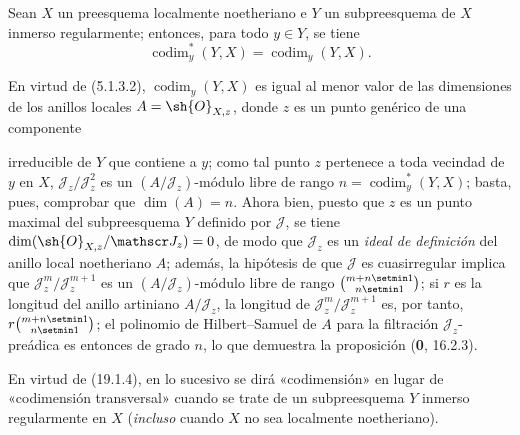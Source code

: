 \begin{proposition}[19.1.4]
\label{IV.19.1.4}
Sean $X$ un preesquema localmente noetheriano e $Y$ un subpreesquema de $X$ inmerso regularmente; entonces, para todo $y\in Y$, se tiene
\begin{equation}
  \operatorname{codim}_y^*(Y,X)=\operatorname{codim}_y(Y,X).
  \tag{19.1.4.1}\label{IV.19.1.4.1}
\end{equation}
\end{proposition}

En virtud de (5.1.3.2), $\operatorname{codim}_y(Y,X)$ es igual al menor valor de las dimensiones de los anillos locales $A=\sh{O}_{X,z}$, donde $z$ es un punto genérico de una componente


irreducible de $Y$ que contiene a $y$; como tal punto $z$ pertenece a toda vecindad de $y$ en $X$, $\mathscr J_z/\mathscr J_z^2$ es un $(A/\mathscr J_z)$-módulo libre de rango $n=\operatorname{codim}_y^*(Y,X)$; basta, pues, comprobar que $\dim(A)=n$. Ahora bien, puesto que $z$ es un punto maximal del subpreesquema $Y$ definido por $\mathscr J$, se tiene $\dim(\sh{O}_{X,z}/\mathscr J_z)=0$, de modo que $\mathscr J_z$ es un \emph{ideal de definición} del anillo local noetheriano $A$; además, la hipótesis de que $\mathscr J$ es cuasirregular implica que $\mathscr J_z^m/\mathscr J_z^{m+1}$ es un $(A/\mathscr J_z)$-módulo libre de rango $\binom{m+n\setmin 1}{n\setmin 1}$; si $r$ es la longitud del anillo artiniano $A/\mathscr J_z$, la longitud de $\mathscr J_z^m/\mathscr J_z^{m+1}$ es, por tanto, $r\binom{m+n\setmin 1}{n\setmin 1}$; el polinomio de Hilbert--Samuel de $A$ para la filtración $\mathscr J_z$-preádica es entonces de grado $n$, lo que demuestra la proposición (\textbf{0}, 16.2.3).

En virtud de (19.1.4), en lo sucesivo se dirá «codimensión» en lugar de «codimensión transversal» cuando se trate de un subpreesquema $Y$ inmerso regularmente en $X$ (\emph{incluso} cuando $X$ no sea localmente noetheriano).

